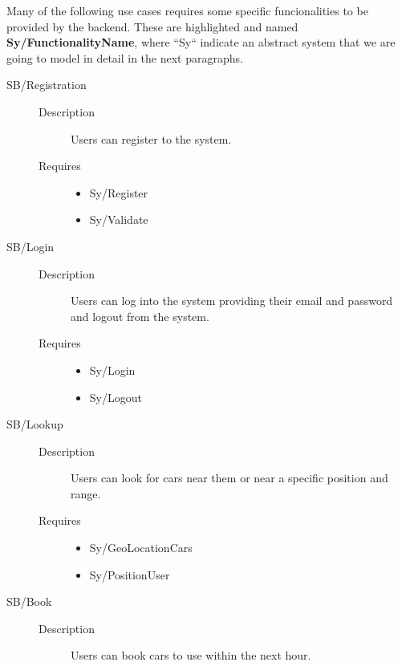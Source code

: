 \documentclass[11pt]{article} %
\begin{document}
Many of the following use cases requires some specific funcionalities to be provided by the backend. These are highlighted and named \textbf{Sy/FunctionalityName}, where ``Sy`` indicate an abstract system that we are going to model in detail in the next paragraphs.

\begin{description}
	\item[SB/Registration] \hfill
	\begin{description}
		\item[Description] Users can register to the system.
		\item[Requires] \hfill
		\begin{itemize}
			\item Sy/Register %
			\item Sy/Validate %
		\end{itemize}
	\end{description}
	\item[SB/Login] \hfill
	\begin{description}
		\item[Description] Users can log into the system providing their email and password and logout from the system.
		\item[Requires] \hfill
		\begin{itemize}
			\item Sy/Login %
			\item Sy/Logout
		\end{itemize}
	\end{description}
	\item[SB/Lookup] \hfill
	\begin{description}
		\item[Description] Users can look for cars near them or near a specific position and range.
		\item[Requires] \hfill
		\begin{itemize}
			\item Sy/GeoLocationCars %
			\item Sy/PositionUser %
		\end{itemize}
	\end{description}
	\item[SB/Book] \hfill
	\begin{description}
		\item[Description] Users can book cars to use within the next hour.

\end{description}
\end{description}
\end{document}
